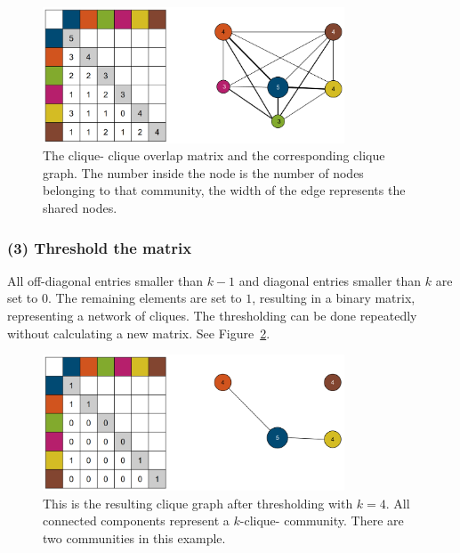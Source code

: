 \documentclass[runningheads,a4paper]{llncs}
\begin{document}
\begin{figure}
\begin{center}
	\includegraphics[width=0.8\textwidth]{img/matrix.png}
		\caption{The clique- clique overlap matrix and the corresponding clique graph. The number inside the node is the number of nodes belonging to that community, the width of the edge represents the shared nodes.}
		\label{fig:matrix}
\end{center}		
\end{figure}


\subsubsection{(3) Threshold the matrix}
All off-diagonal entries smaller than $k-1$ and diagonal entries smaller than $k$ are set to $0$.
The remaining elements are set to $1$, resulting in a binary matrix, representing a network of cliques. The thresholding can be done repeatedly without calculating a new matrix. See Figure~\ref{fig:matrixtrashed}.

\begin{figure}
\begin{center}
	\includegraphics[width=0.8\textwidth]{img/matrixtrashed}
		\caption{This is the resulting clique graph after thresholding with $k=4$. All connected components represent a $k$-clique- community. There are two communities in this example.}
		\label{fig:matrixtrashed}
\end{center}
\end{figure}
 
\end{document}
